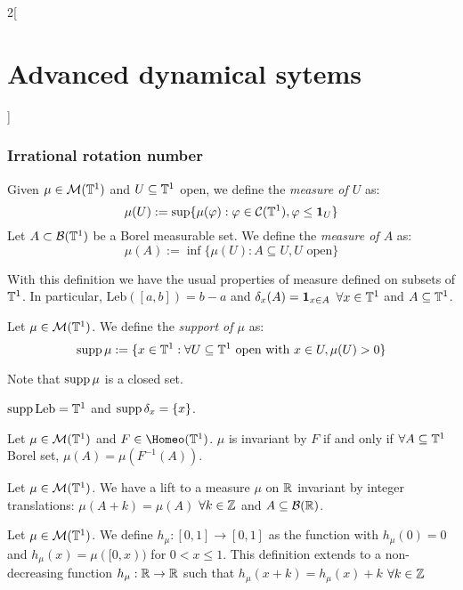 \documentclass[../../../main_math.tex]{subfiles}
\begin{document}
\begin{multicols}{2}[\section{Advanced dynamical sytems}]
  \subsubsection{Irrational rotation number}
  \begin{definition}
    Given $\mu\in \mathcal{M}(\mathbb{T}^1)$ and $U\subseteq \mathbb{T}^1$ open, we define the \emph{measure of $U$} as:
    $$
      \mu(U):=\sup\{\mu(\varphi):\varphi\in\mathcal{C}(\mathbb{T}^1),\varphi\leq \boldsymbol{\mathrm{1}}_{U}\}
    $$
    Let $A\subset \mathcal{B}(\mathbb{T}^1)$ be a Borel measurable set. We define the \emph{measure of $A$} as:
    $$
      \mu(A):=\inf\{\mu(U):A\subseteq U, U\text{ open}\}
    $$
  \end{definition}
  \begin{remark}
    With this definition we have the usual properties of measure defined on subsets of $\mathbb{T}^1$. In particular, $\text{Leb}([a,b])=b-a$ and $\delta_x(A)=\boldsymbol{\mathrm{1}}_{x\in A}$ $\forall x\in \mathbb{T}^1$ and $A\subseteq \mathbb{T}^1$.
  \end{remark}
  \begin{definition}
    Let $\mu\in \mathcal{M}(\mathbb{T}^1)$. We define the \emph{support of $\mu$} as:
    $$
      \operatorname{supp}\mu:=\{x\in\mathbb{T}^1:\forall U\subseteq \mathbb{T}^1\text{ open with } x\in U,\mu(U)>0\}
    $$
  \end{definition}
  \begin{remark}
    Note that $\operatorname{supp}\mu $ is a closed set.
  \end{remark}
  \begin{remark}
    $\operatorname{supp}\text{Leb}=\mathbb{T}^1$ and $\operatorname{supp}\delta_{x}=\{x\}$.
  \end{remark}
  \begin{proposition}
    Let $\mu\in \mathcal{M}(\mathbb{T}^1)$ and $F\in\Homeo(\TT^1)$. $\mu$ is invariant by $F$ if and only if $\forall A\subseteq \mathbb{T}^1$ Borel set, $\mu(A)=\mu(F^{-1}(A))$.
  \end{proposition}
  \begin{lemma}
    Let $\mu\in \mathcal{M}(\mathbb{T}^1)$. We have a lift to a measure $\mu$ on $\mathbb{R}$ invariant by integer translations: $\mu(A+k)=\mu(A)$ $\forall k\in\mathbb{Z}$ and $A\subseteq \mathcal{B}(\mathbb{R})$.
  \end{lemma}
  \begin{definition}
    Let $\mu\in\mathcal{M}(\mathbb{T}^1)$. We define $h_\mu:[0,1]\to [0,1]$ as the function with $h_\mu(0)=0$ and $h_\mu(x)=\mu([0,x))$ for $0<x\leq 1$. This definition extends to a non-decreasing function $h_\mu:\mathbb{R}\to\mathbb{R}$ such that $h_\mu(x+k)=h_\mu(x)+k$ $\forall k\in\mathbb{Z}$
  \end{definition}

\end{multicols}
\end{document}
